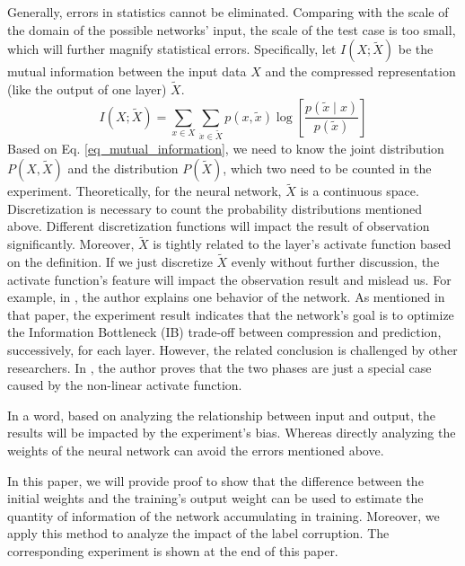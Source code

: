 \documentclass[letterpaper]{article} %
\begin{document}
Generally, errors in statistics cannot be eliminated. Comparing with the scale of the domain of the possible networks' input, the scale of the test case is too small, which will further magnify statistical errors. Specifically, let $I(X;\tilde{X})$ be the mutual information between the input data $X$ and the compressed representation (like the output of one layer) $\tilde{X}$.
\begin{equation}
    I(X ; \tilde{X})=\sum_{x \in X} \sum_{\dot{x} \in \tilde{X}} p(x, \tilde{x}) \log \left[\frac{p(\tilde{x} \mid x)}{p(\tilde{x})}\right]
    \label{eq_mutual_information}
\end{equation}
Based on Eq. \ref{eq_mutual_information}, we need to know the joint distribution $P(X,\tilde{X})$ and the distribution $P(\tilde{X})$, which two need to be counted in the experiment. Theoretically, for the neural network, $\tilde{X}$ is a continuous space. Discretization is necessary to count the probability distributions mentioned above. Different discretization functions will impact the result of observation significantly. Moreover, $\tilde{X}$ is tightly related to the layer's activate function based on the definition. If we just discretize $\tilde{X}$ evenly without further discussion, the activate function's feature will impact the observation result and mislead us. For example, in \cite{shwartz2017opening}, the author explains one behavior of the network. As mentioned in that paper, the experiment result indicates that the network's goal is to optimize the Information Bottleneck (IB) trade-off between compression and prediction, successively, for each layer. However, the related conclusion is challenged by other researchers. In \cite{saxe2019information}, the author proves that the two phases are just a special case caused by the non-linear activate function.

In a word, based on analyzing the relationship between input and output, the results will be impacted by the experiment's bias. Whereas directly analyzing the weights of the neural network can avoid the errors mentioned above.

In this paper, we will provide proof to show that the difference between the initial weights and the training's output weight can be used to estimate the quantity of information of the network accumulating in training. Moreover, we apply this method to analyze the impact of the label corruption. The corresponding experiment is shown at the end of this paper.
\end{document}
